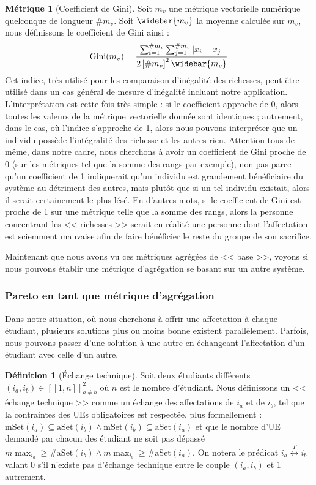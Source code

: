 \documentclass{rapport}
\theoremstyle{definition}
\newtheorem{definition}{Définition}
\theoremstyle{remark}
\theoremstyle{definition}
\newtheorem*{metric}{Métrique}
\theoremstyle{remark}
\begin{document}
\begin{metric}[Coefficient de Gini]
    Soit $m_v$ une métrique vectorielle numérique quelconque de longueur $\#m_v$. Soit $\widebar{m_v}$ la moyenne calculée sur $m_v$, nous définissons le coefficient de Gini ainsi :
    $$
        \text{Gini}(m_v) = \frac{\sum_{i=1}^{\#m_v}\sum_{j=1}^{\#m_v}\left|x_i-x_j\right|}{2\left[\#m_v\right]^2\widebar{m_v}}
    $$
    Cet indice, très utilisé pour les comparaison d'inégalité des richesses, peut être utilisé dans un cas général de mesure d'inégalité incluant notre application.
    L'interprétation est cette fois très simple : si le coefficient approche de 0, alors toutes les valeurs de la métrique vectorielle donnée sont identiques ; autrement, dans le cas, où l'indice s'approche de 1, alors nous pouvons interpréter que un individu possède l'intégralité des richesse et les autres rien.
    Attention tous de même, dans notre cadre, nous cherchons à avoir un coefficient de Gini proche de 0 (sur les métriques tel que la somme des rangs par exemple), non pas parce qu'un coefficient de 1 indiquerait qu'un individu est grandement bénéficiaire du système au détriment des autres, mais plutôt que si un tel individu existait, alors il serait certainement le plus lésé.
    En d'autres mots, si le coefficient de Gini est proche de 1 sur une métrique telle que la somme des rangs, alors la personne concentrant les << richesses >> serait en réalité une personne dont l'affectation est sciemment mauvaise afin de faire bénéficier le reste du groupe de son sacrifice.
\end{metric}

Maintenant que nous avons vu ces métriques agrégées de << base >>, voyons si nous pouvons établir une métrique d'agrégation se basant sur un autre système.

\subsubsection{Pareto en tant que métrique d'agrégation}
Dans notre situation, où nous cherchons à offrir une affectation à chaque étudiant, plusieurs solutions plus ou moins bonne existent parallèlement.
Parfois, nous pouvons passer d'une solution à une autre en échangeant l'affectation d'un étudiant avec celle d'un autre.

\begin{definition}[Échange technique]
    Soit deux étudiants différents $\left(i_a,i_b\right)\in[\![1,n]\!]^2_{a\ne b}$ où $n$ est le nombre d'étudiant.
    Nous définissons un << échange technique >> comme un échange des affectations de $i_a$ et de $i_b$, tel que la contraintes des UEs obligatoires est respectée, plus formellement : $\text{mSet}(i_a)\subseteq\text{aSet}(i_b) \land \text{mSet}(i_b)\subseteq\text{aSet}(i_a)$
    et que le nombre d'UE demandé par chacun des étudiant ne soit pas dépassé $m\!\max_{i_a}\ge\#\text{aSet}(i_b)\land m\!\max_{i_b}\ge\#\text{aSet}(i_a)$.
    On notera le prédicat $i_a\stackrel{T}{\longleftrightarrow} i_b$ valant 0 s'il n'existe pas d'échange technique entre le couple $(i_a, i_b)$ et 1 autrement.
\end{definition}
\end{document}
